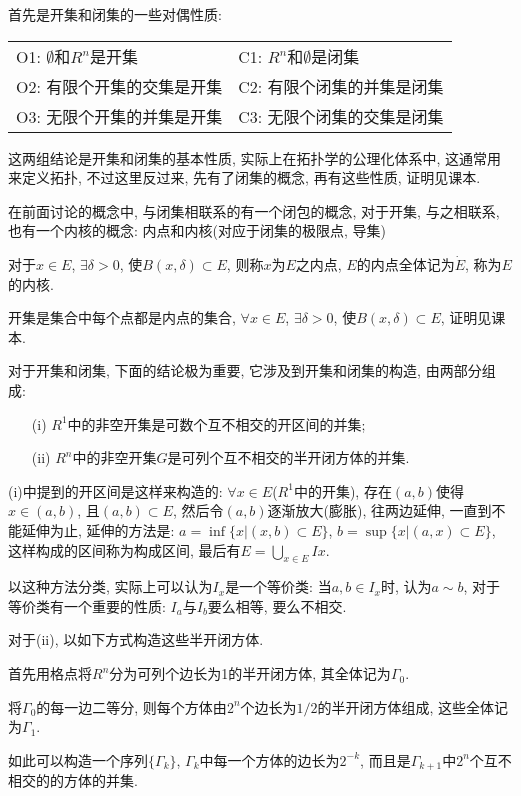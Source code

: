 \documentclass[12pt,a4paper,openany]{book}
\begin{document}
首先是开集和闭集的一些对偶性质:

\begin{tabular}{ll}
\hline 
O1: $\emptyset$和$R^n$是开集 & C1: $R^n$和$\emptyset$是闭集 \\
O2: 有限个开集的交集是开集 & C2: 有限个闭集的并集是闭集 \\
O3: 无限个开集的并集是开集 & C3: 无限个闭集的交集是闭集 \\
\hline
\end{tabular}

这两组结论是开集和闭集的基本性质, 实际上在拓扑学的公理化体系中, 这通常用来定义拓扑, 不过这里反过来, 先有了闭集的概念, 再有这些性质, 证明见课本.

在前面讨论的概念中, 与闭集相联系的有一个闭包的概念, 对于开集, 与之相联系, 也有一个内核的概念: 内点和内核(对应于闭集的极限点, 导集)

对于$x \in E$, $\exists \delta > 0$, 使$B(x, \delta) \subset E$, 则称$x$为$E$之内点, $E$的内点全体记为$\Dot{E}$, 称为$E$的内核.

开集是集合中每个点都是内点的集合, $\forall x \in E$, $\exists \delta > 0$, 使$B(x, \delta) \subset E$, 证明见课本.

对于开集和闭集, 下面的结论极为重要, 它涉及到开集和闭集的构造, 由两部分组成:
\begin{enumerate}
\item[(i)] $R^1$中的非空开集是可数个互不相交的开区间的并集;
\item[(ii)] $R^n$中的非空开集$G$是可列个互不相交的半开闭方体的并集.
\end{enumerate}

(i)中提到的开区间是这样来构造的: $\forall x \in E$($R^1$中的开集), 存在$(a, b)$使得$x \in (a, b)$, 且$(a, b) \subset E$, 然后令$(a, b)$逐渐放大(膨胀), 往两边延伸, 一直到不能延伸为止, 延伸的方法是: $a = \inf\{x | (x, b) \subset E \}$, $b = \sup\{x|(a, x) \subset E\}$, 这样构成的区间称为构成区间, 最后有$E = \bigcup_{x \in E}{Ix}$.

以这种方法分类, 实际上可以认为$I_x$是一个等价类: 当$a, b \in I_x$时, 认为$a \sim b$, 对于等价类有一个重要的性质: $I_a$与$I_b$要么相等, 要么不相交.

对于(ii), 以如下方式构造这些半开闭方体.

首先用格点将$R^n$分为可列个边长为1的半开闭方体, 其全体记为$\Gamma_0$.

将$\Gamma_0$的每一边二等分, 则每个方体由$2^n$个边长为$1/2$的半开闭方体组成, 这些全体记为$\Gamma_1$.

如此可以构造一个序列$\{\Gamma_k\}$, $\Gamma_k$中每一个方体的边长为$2^{-k}$, 而且是$\Gamma_{k+1}$中$2^n$个互不相交的的方体的并集.
\end{document}
